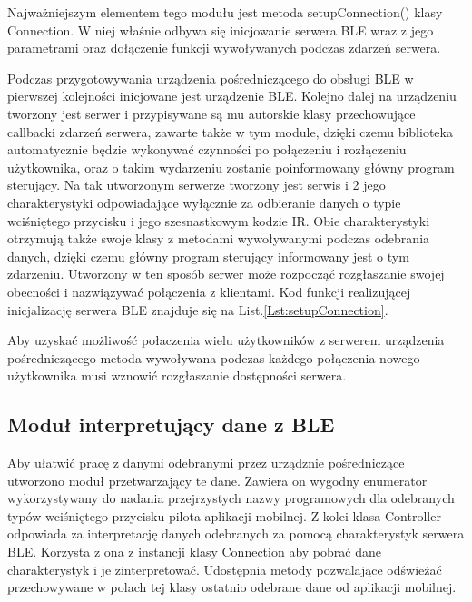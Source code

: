 \documentclass[12pt,twoside]{article}
\begin{document}


Najważniejszym elementem tego modułu jest metoda setupConnection() klasy Connection. W niej właśnie odbywa się inicjowanie serwera BLE wraz z jego parametrami oraz dołączenie funkcji wywoływanych podczas zdarzeń serwera.

Podczas przygotowywania urządzenia pośredniczącego do obsługi BLE w pierwszej kolejności inicjowane jest urządzenie BLE. Kolejno dalej na urządzeniu tworzony jest serwer i przypisywane są mu autorskie klasy przechowujące callbacki zdarzeń serwera, zawarte także w tym module, dzięki czemu biblioteka automatycznie będzie wykonywać czynności po połączeniu i rozłączeniu użytkownika, oraz o takim wydarzeniu zostanie poinformowany główny program sterujący. 
Na tak utworzonym serwerze tworzony jest serwis i 2 jego charakterystyki odpowiadające wyłącznie za odbieranie danych o typie wciśniętego przycisku i jego szesnastkowym kodzie IR. Obie charakterystyki otrzymują także swoje klasy z metodami wywoływanymi podczas odebrania danych, dzięki czemu główny program sterujący informowany jest o tym zdarzeniu. Utworzony w ten sposób serwer może rozpocząć rozgłaszanie swojej obecności i nazwiązywać połączenia z klientami. Kod funkcji realizującej inicjalizację serwera BLE znajduje się na List.\ref*{Lst:setupConnection}. 



Aby uzyskać możliwość połaczenia wielu użytkowników z serwerem urządzenia pośredniczącego metoda wywoływana podczas każdego połączenia nowego użytkownika musi wznowić rozgłaszanie dostępności serwera.
\subsection{Moduł interpretujący dane z BLE}
Aby ułatwić pracę z danymi odebranymi przez urządznie pośredniczące utworzono moduł przetwarzający te dane. Zawiera on wygodny enumerator wykorzystywany do nadania przejrzystych nazwy programowych dla odebranych typów wciśniętego przycisku pilota aplikacji mobilnej.
Z kolei klasa Controller odpowiada za interpretację danych odebranych za pomocą charakterystyk serwera BLE. Korzysta z ona z instancji klasy Connection aby pobrać dane charakterystyk i je zinterpretować. Udostępnia metody pozwalające odświeżać przechowywane w polach tej klasy ostatnio odebrane dane od aplikacji mobilnej.
\end{document}
